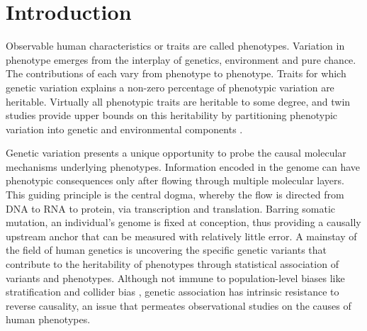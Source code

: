 %
%


\chapter{Introduction}
\label{ch:introduction}

\begin{outline}

Observable human characteristics or traits are called phenotypes.
Variation in phenotype emerges from the interplay of genetics, environment and pure chance.
The contributions of each vary from phenotype to phenotype.
Traits for which genetic variation explains a non-zero percentage of phenotypic variation are heritable.
Virtually all phenotypic traits are heritable to some degree, 
and twin studies provide upper bounds on this heritability by partitioning phenotypic variation into genetic and environmental components \autocite{polderman2015MetaanalysisHeritabilityHuman}.

Genetic variation presents a unique opportunity to probe the causal molecular mechanisms underlying phenotypes.
Information encoded in the genome can have phenotypic consequences only after flowing through multiple molecular layers.
This guiding principle is the central dogma, whereby the flow is directed from DNA to RNA to protein, via transcription and translation.
Barring somatic mutation, an individual's genome is fixed at conception, thus providing a causally upstream anchor that can be measured with relatively little error.
A mainstay of the field of human genetics is uncovering the specific genetic variants that contribute to the heritability of phenotypes through statistical association of variants and phenotypes.
Although not immune to population-level biases like stratification \autocite{lawson2020PopulationStructureGenetic} and collider bias \autocite{day2016RobustExampleCollider},
genetic association has intrinsic resistance to reverse causality, an issue that permeates observational studies on the causes of human phenotypes.


\end{outline}

